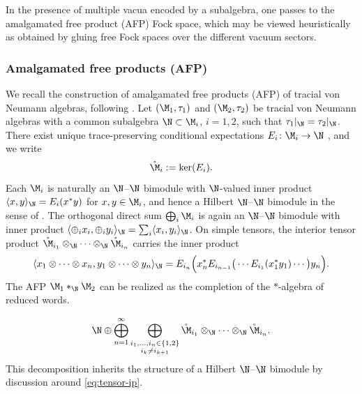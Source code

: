 \documentclass[sn-mathphys-num]{sn-jnl}
\begin{document}
In the presence of multiple vacua encoded by a subalgebra, one passes to the
amalgamated free product (AFP) Fock space, which may be viewed heuristically
as obtained by gluing free Fock spaces over the different vacuum sectors.
\subsubsection{Amalgamated free products (AFP)}
\label{sec:afp}

We recall the construction of amalgamated free products (AFP) of tracial von Neumann algebras, following
\cite{speicher_combinatorial_1998,araki_operator_1985,ioana_amalgamated_2008,voiculescu_free_1992,brown_-algebras_2008}.
Let $(\M_{1},\tau_{1})$ and $(\M_{2},\tau_{2})$ be tracial von Neumann algebras with a common subalgebra
$\N\subset \M_{i}$, $i=1,2$, such that $\tau_{1}|_{\N}=\tau_{2}|_{\N}$.
There exist unique trace-preserving conditional expectations
$E_i\colon \M_i\to \N$ \cite[Theorem~4.2]{takesaki_theory_2003-2}, and we write
\[
  \mathring{\M}_i := \ker(E_i).
\]
Each $\M_i$ is naturally an $\N$--$\N$ bimodule with $\N$-valued inner product
$\langle x,y\rangle_{\N}=E_i(x^*y)$ for $x,y\in\M_i$, and hence a Hilbert
$\N$--$\N$ bimodule in the sense of \cite{lance1995hilbert}.
The orthogonal direct sum
$\bigoplus_i \M_i$ is again an $\N$--$\N$ bimodule with inner product
$\langle\oplus_i x_i,\oplus_i y_i\rangle_{\N}=\sum_i\langle x_i,y_i\rangle_{\N}$.
On simple tensors, the interior tensor product
$\mathring{\M}_{i_1}\otimes_\N\cdots\otimes_\N\mathring{\M}_{i_n}$ carries the inner product
\begin{equation}\label{eq:tensor-ip}
\langle x_1\otimes\cdots\otimes x_n,  y_1\otimes\cdots\otimes y_n\rangle_{\N}
=E_{i_n}  \Big(x_n^* E_{i_{n-1}}  \big(\cdots E_{i_1}(x_1^*y_1)\cdots\big) y_n\Big).
\end{equation}
The AFP $\M_1*_{\N}\M_2$ can be realized as the completion of the
$*$-algebra of reduced words.

\begin{equation}\label{eq:reduced-word}
  \N \oplus
  \bigoplus_{n=1}^\infty
    \bigoplus_{\substack{i_1,\dots,i_n\in\{1,2\}\\ i_k\neq i_{k+1}}}
    \mathring{\M}_{i_1}\otimes_\N \cdots \otimes_\N \mathring{\M}_{i_n}.
\end{equation}
This decomposition inherits the structure of a Hilbert $\N$--$\N$ bimodule by discussion around \cref{eq:tensor-ip}.
\end{document}

